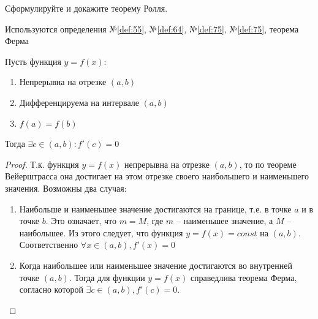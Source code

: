 \begin{question}
    Сформулируйте и докажите теорему Ролля.
\end{question}
\begin{used}
    Используются определения №\ref{def:55}, №\ref{def:64}, №\ref{def:75}, №\ref{def:75}, теорема Ферма
\end{used}
\begin{theorem}
    Пусть функция $y = f(x)$:
     \begin{enumerate}
      \item Непрерывна на отрезке $(a, b)$ 
      \item Дифференцируема на интервале  $(a, b)$
      \item $f(a) = f(b)$
    \end{enumerate}
    Тогда $\exists c \in (a, b) : f'(c) = 0$
\end{theorem}
\begin{proof}
    Т.к. функция $y = f(x)$ непрерывна на отрезке $(a,b)$, то по теореме Вейерштрасса она достигает на этом отрезке своего наибольшего и наименьшего значения. Возможны два случая:
    \begin{enumerate}
        \item Наибольше и наименьшее значение достигаются на границе, т.е. в точке $a$ и в точке  $b$. Это означает, что  $m = M$, где  $m$ -- наименьшее значение, а  $M$ -- наибольшее. Из этого следует, что функция  $y = f(x) = const$ на $(a, b)$. Соответственно  $\forall x \in (a, b), f'(x) = 0$
        \item Когда наибольшее или наименьшее значение достигаются во внутренней точке $(a, b)$. Тогда для функции $y = f(x)$ справедлива теорема Ферма, согласно которой $\exists c \in (a, b), f'(c) = 0$.
    \end{enumerate}
\end{proof}
\pagebreak



